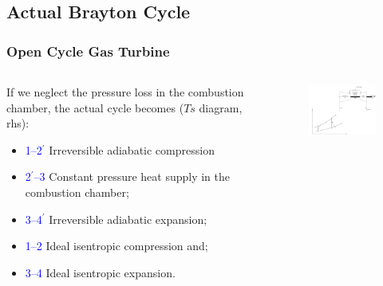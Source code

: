\documentclass[10pt,compress]{beamer}
\begin{document}
\subsection{Actual Brayton Cycle}
\begin{frame}
 \frametitle{Open Cycle Gas Turbine}
 \begin{columns}
  \begin{column}[c]{0.4\linewidth} 
If we neglect the pressure loss in the combustion chamber, the actual cycle becomes ($Ts$ diagram, rhs):
 \begin{itemize}
  \item <1-> \textcolor{blue}{1--2$^{\prime}$} Irreversible adiabatic compression
  \item <2-> \textcolor{blue}{2$^{\prime}$--3} Constant pressure heat supply in the combustion chamber;
  \item <3-> \textcolor{blue}{3--4$^{\prime}$} Irreversible adiabatic expansion;
  \item <4-> \textcolor{blue}{1--2} Ideal isentropic compression and;
  \item <5-> \textcolor{blue}{3--4} Ideal isentropic expansion.
 \end{itemize}
  \end{column}
  \begin{column}[c]{0.6\linewidth}
    \begin{center}
   \begin{figure}%
     \includegraphics[height=6.cm,width=6.5cm,clip]{./Pics/Brayton_cycle3}
   \end{figure}  
    \end{center}
  \end{column}  
 \end{columns}

\end{frame}
\end{document}
